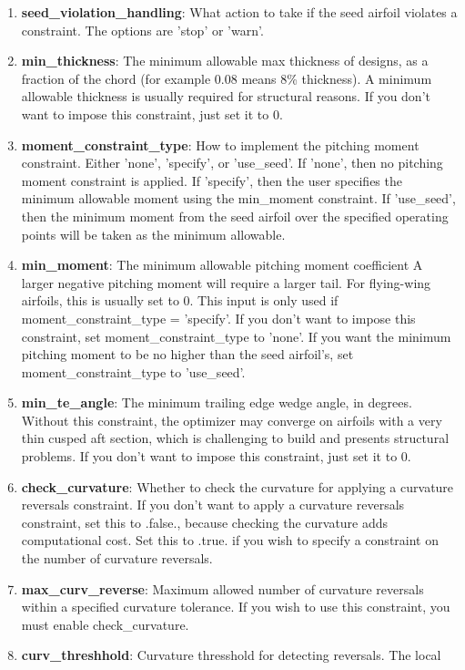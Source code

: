 \documentclass[11pt]{article}
\begin{document}
\begin{enumerate}
\item{\textbf{seed\_violation\_handling}: What action to take if the seed airfoil violates
a constraint.  The options are 'stop' or 'warn'.}
\item{\textbf{min\_thickness}: The minimum allowable max thickness of designs, as a
fraction of the chord (for example 0.08 means 8\% thickness).  A minimum allowable
thickness is usually required for structural reasons.  If you don't want to impose this
constraint, just set it to 0.}
\item{\textbf{moment\_constraint\_type}: How to implement the pitching moment constraint.
Either 'none', 'specify', or 'use\_seed'.  If 'none', then no pitching moment constraint
is applied.  If 'specify', then the user specifies the minimum allowable moment using the 
min\_moment constraint.  If 'use\_seed', then the minimum moment from the seed airfoil 
over the specified operating points will be taken as the minimum allowable.}
\item{\textbf{min\_moment}: The minimum allowable pitching moment coefficient 
A larger negative pitching moment will require a 
larger tail.  For flying-wing airfoils, this is usually set to 0.  This input is only used
if moment\_constraint\_type = 'specify'.  If you don't want to 
impose this constraint, set moment\_constraint\_type to 'none'.  If you want the minimum
pitching moment to be no higher than the seed airfoil's, set moment\_constraint\_type to
'use\_seed'.} 
\item{\textbf{min\_te\_angle}: The minimum trailing edge wedge angle, in degrees.  Without
this constraint, the optimizer may converge on airfoils with a very thin cusped aft
section, which is challenging to build and presents structural problems.  If you don't
want to impose this constraint, just set it to 0.}
\item{\textbf{check\_curvature}: Whether to check the curvature for applying a curvature
reversals constraint.  If you don't want to apply a curvature reversals constraint, set
this to .false., because checking the curvature adds computational cost.  Set this to
.true. if you wish to specify a constraint on the number of curvature reversals.}
\item{\textbf{max\_curv\_reverse}: Maximum allowed number of curvature reversals within a
specified curvature tolerance.  If you wish to use this constraint, you must enable
check\_curvature.}
\item{\textbf{curv\_threshhold}: Curvature thresshold for detecting reversals.  The local
}
\end{enumerate}
\end{document}
